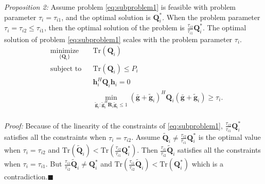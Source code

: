 \documentclass[conference]{IEEEtran}
\begin{document}
\emph{Proposition 2:} Assume problem \eqref{eq:subproblem1} is feasible with problem parameter $\tau_i = \tau_{i1}$, and the optimal solution is $\mathbf{Q}_i^*$. When the problem parameter $\tau_i = \tau_{i2} \leq \tau_{i1}$, then the optimal solution of the problem is $\frac{\tau_{i2}}{\tau_{i1}}\mathbf{Q}_i^*$. The optimal solution of problem \eqref{eq:subproblem1} scales with the problem parameter $\tau_i$.
\begin{equation}
\begin{aligned} \label{eq:subproblem1}
& \underset{\{\mathbf{Q}_i\}}{\text{minimize}}
& & \mathrm{Tr}(\mathbf{Q}_i) \\
& \text{subject to}
& & \mathrm{Tr}(\mathbf{Q}_i) \leq P_i\\
&&& \mathbf{h}_i^H \mathbf{Q}_i \mathbf{h}_i= 0\\
&&& \min_{\tilde{\mathbf{g}}_i: \tilde{\mathbf{g}}_i^H \mathbf{R}_i\tilde{\mathbf{g}}_i \leq 1}(\bar{\mathbf{g}}+\tilde{\mathbf{g}}_i)^H\mathbf{Q}_i(\bar{\mathbf{g}}+\tilde{\mathbf{g}}_i) \geq  \tau_{i}.\\
\end{aligned}
\end{equation}

\emph{Proof:} Because of the linearity of the constraints of \eqref{eq:subproblem1},  $\frac{\tau_{i2}}{\tau_{i1}}\mathbf{Q}_i^*$ satisfies all the constraints when $\tau_i = \tau_{i2}$. Assume $\tilde{\mathbf{Q}}_i \neq \frac{\tau_{i2}}{\tau_{i1}}\mathbf{Q}_i^*$ is the optimal value when $\tau_i = \tau_{i2}$ and $\mathrm{Tr}(\tilde{\mathbf{Q}}_i) < \mathrm{Tr}(\frac{\tau_{i2}}{\tau_{i1}}\mathbf{Q}_i^*)$. Then $\frac{\tau_{i1}}{\tau_{i2}}\tilde{\mathbf{Q}}_i$ satisfies all the constraints when $\tau_i = \tau_{i1}$. But $\frac{\tau_{i1}}{\tau_{i2}}\tilde{\mathbf{Q}}_i \neq \mathbf{Q}_i^*$ and $\mathrm{Tr}(\frac{\tau_{i1}}{\tau_{i2}}\tilde{\mathbf{Q}}_i) < \mathrm{Tr}(\mathbf{Q}_i^*)$ which is a contradiction.$\blacksquare$
\end{document}
